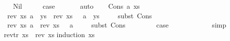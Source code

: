 \begin{isabellebody}
\ \ \isamarkupfalse%
\ Nil\isanewline
\ \ \isamarkupfalse%
\ \isamarkupfalse%
\ {\isacharquery}{\kern0pt}case\ \isanewline
\ \ \ \ \isamarkupfalse%
\ auto\isanewline
{}\isamarkupfalse%
\isanewline
\ \ \isamarkupfalse%
\ {\isacharparenleft}{\kern0pt}Cons\ a\ xs{\isacharparenright}{\kern0pt}\isanewline
\ \ \isamarkupfalse%
\ {}{\isacharcolon}{\kern0pt}\ {\isachardoublequoteopen}rev{\isacharprime}{\kern0pt}\ xs\ {\isacharparenleft}{\kern0pt}a\ {\isacharhash}{\kern0pt}\ ys{\isacharparenright}{\kern0pt}\ {\isacharequal}{\kern0pt}\ {\isacharparenleft}{\kern0pt}rev{\isacharprime}{\kern0pt}\ xs\ {\isacharbrackleft}{\kern0pt}{\isacharbrackright}{\kern0pt}{\isacharparenright}{\kern0pt}\ {\isacharat}{\kern0pt}\ {\isacharparenleft}{\kern0pt}a\ {\isacharhash}{\kern0pt}\ ys{\isacharparenright}{\kern0pt}{\isachardoublequoteclose}\isanewline
\ \ \ \ \isamarkupfalse%
{\isacharparenleft}{\kern0pt}subst\ Cons{\isacharparenright}{\kern0pt}\isanewline
\ \ \ \ \isacommand{{\isachardot}{\kern0pt}{\isachardot}{\kern0pt}}\isamarkupfalse%
\isanewline
\ \ \isamarkupfalse%
\ {}{\isacharcolon}{\kern0pt}\ {\isachardoublequoteopen}rev{\isacharprime}{\kern0pt}\ xs\ {\isacharbrackleft}{\kern0pt}a{\isacharbrackright}{\kern0pt}\ {\isacharequal}{\kern0pt}\ {\isacharparenleft}{\kern0pt}rev{\isacharprime}{\kern0pt}\ xs\ {\isacharbrackleft}{\kern0pt}{\isacharbrackright}{\kern0pt}{\isacharparenright}{\kern0pt}\ {\isacharat}{\kern0pt}\ {\isacharbrackleft}{\kern0pt}a{\isacharbrackright}{\kern0pt}{\isachardoublequoteclose}\isanewline
\ \ \ \ \isamarkupfalse%
{\isacharparenleft}{\kern0pt}subst\ Cons{\isacharparenright}{\kern0pt}\isanewline
\ \ \ \ \isacommand{{\isachardot}{\kern0pt}{\isachardot}{\kern0pt}}\isamarkupfalse%
\isanewline
\ \ \isamarkupfalse%
\ {\isacharquery}{\kern0pt}case\isanewline
\ \ \ \ \isamarkupfalse%
\ {}\ {}\isanewline
\ \ \ \isamarkupfalse%
\ simp\isanewline
{}\isamarkupfalse%
%
\endisatagproof
{\isafoldproof}%
%
\isadelimproof
\isanewline
%
\endisadelimproof
\isanewline
\ \isanewline
{}\isamarkupfalse%
\ {\isachardoublequoteopen}rev{\isacharunderscore}{\kern0pt}tr\ xs\ {\isacharequal}{\kern0pt}\ rev\ xs{\isachardoublequoteclose}\isanewline
%
\isadelimproof
\isanewline
%
\endisadelimproof
%
\isatagproof
{}\isamarkupfalse%
{\isacharparenleft}{\kern0pt}induction\ xs{\isacharparenright}{\kern0pt}\isanewline

\end{isabellebody}
